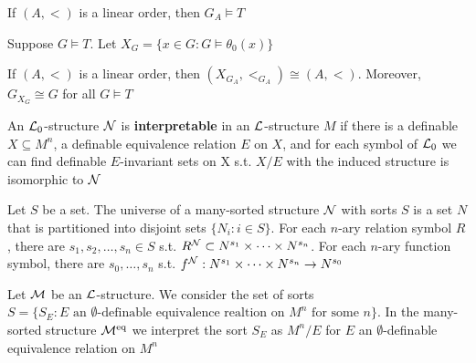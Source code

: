 \documentclass[11pt]{article}
\begin{document}
If \((A,<)\) is a linear order, then \(G_A\vDash T\)

Suppose \(G\vDash T\). Let \(X_G=\{x\in G:G\vDash\theta_0(x)\}\)

\begin{lemma}[]
If \((A,<)\) is a linear order, then \((X_{G_A},<_{G_A})\cong(A,<)\). Moreover,
\(G_{X_G}\cong G\) for all \(G\vDash T\)
\end{lemma}

\begin{definition}[]
An \(\mathcal{L}_0\)-structure \(\mathcal{N}\) is \textbf{interpretable} in an
\(\mathcal{L}\)-structure \(M\) if there is a definable \(X\subseteq M^n\), a definable
equivalence relation \(E\) on \(X\), and for each symbol of \(\mathcal{L}_0\) we can find
definable \(E\)-invariant sets on X s.t. \(X/E\) with the induced structure is
isomorphic to \(\mathcal{N}\)
\end{definition}

Let \(S\) be a set. The universe of a many-sorted structure \(\mathcal{N}\) with sorts \(S\) is a set \(N\)
that is partitioned into disjoint sets \(\{N_i:i\in S\}\). For each \(n\)-ary relation symbol \(R\),
there are \(s_1,s_2,\dots,s_n\in S\) s.t. \(R^{\mathcal{N}}\subset N^{s_1}\times\dots\times N^{s_n}\). For each \(n\)-ary function
symbol, there are \(s_0,\dots,s_n\) s.t. \(f^{\mathcal{N}}:N^{s_1}\times\dots\times N^{s_n}\to N^{s_0}\)

Let \(\mathcal{M}\) be an \(\mathcal{L}\)-structure. We consider the set of
sorts \(S=\{S_E:E\text{ an $\emptyset$-definable equivalence realtion on $M^n$ for some $n$}\}\). In the
many-sorted structure \(\mathcal{M}^{\operatorname{eq}}\) we interpret the sort \(S_E\) as \(M^n/E\) for \(E\)
an \(\emptyset\)-definable equivalence relation on \(M^n\)
\end{document}
